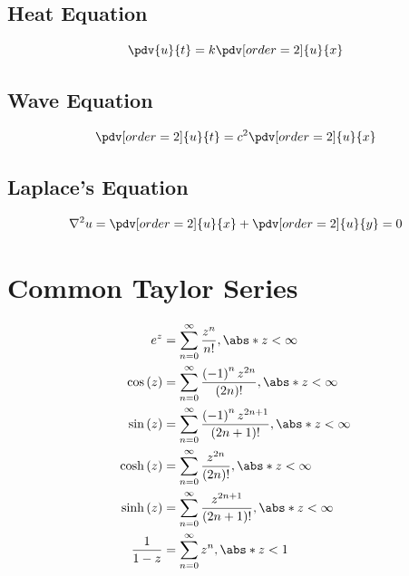 \documentclass{article}
\begin{document}
\begin{multicols*}{3}
    \subsection{Heat Equation}
    \begin{equation*}
        \pdv{u}{t} = k \pdv[order=2]{u}{x}
    \end{equation*}
    \subsection{Wave Equation}
    \begin{equation*}
        \pdv[order=2]{u}{t} = c^2 \pdv[order=2]{u}{x}
    \end{equation*}
    \subsection{Laplace's Equation}
    \begin{equation*}
        \nabla^2 u = \pdv[order=2]{u}{x} + \pdv[order=2]{u}{y} = 0
    \end{equation*}
    \section{Common Taylor Series}
    \begin{align*}
        e^z                     & = \sum_{n = 0}^\infty \frac{z^n}{n!}, \abs*{z} < \infty                                                \\
        \cos{\left( z \right)}  & = \sum_{n = 0}^\infty \frac{\left( -1 \right)^n z^{2n}}{\left( 2n \right)!}, \abs*{z} < \infty         \\
        \sin{\left( z \right)}  & = \sum_{n = 0}^\infty \frac{\left( -1 \right)^n z^{2n + 1}}{\left( 2n + 1 \right)!}, \abs*{z} < \infty \\
        \cosh{\left( z \right)} & = \sum_{n = 0}^\infty \frac{z^{2n}}{\left( 2n \right)!}, \abs*{z} < \infty                             \\
        \sinh{\left( z \right)} & = \sum_{n = 0}^\infty \frac{z^{2n + 1}}{\left( 2n + 1 \right)!}, \abs*{z} < \infty                     \\
        \frac{1}{1 - z}         & = \sum_{n = 0}^\infty z^n, \abs*{z} < 1
    \end{align*}
\end{multicols*}
\end{document}
